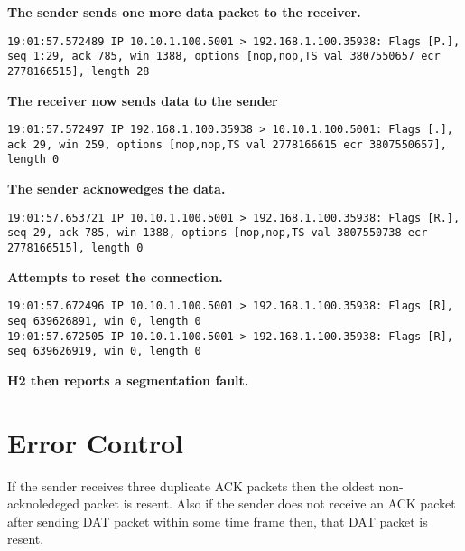 \documentclass{article}
\begin{document}
{\begin{lstlisting}
\end{lstlisting}
    \textbf{The sender sends one more data packet to the receiver.}
\begin{lstlisting}
19:01:57.572489 IP 10.10.1.100.5001 > 192.168.1.100.35938: Flags [P.], seq 1:29, ack 785, win 1388, options [nop,nop,TS val 3807550657 ecr 2778166515], length 28
\end{lstlisting}
    \textbf{The receiver now sends data to the sender}
\begin{lstlisting}
19:01:57.572497 IP 192.168.1.100.35938 > 10.10.1.100.5001: Flags [.], ack 29, win 259, options [nop,nop,TS val 2778166615 ecr 3807550657], length 0
\end{lstlisting}
    \textbf{The sender acknowedges the data.}
\begin{lstlisting}
19:01:57.653721 IP 10.10.1.100.5001 > 192.168.1.100.35938: Flags [R.], seq 29, ack 785, win 1388, options [nop,nop,TS val 3807550738 ecr 2778166515], length 0
\end{lstlisting}
    \textbf{Attempts to reset the connection.}
\begin{lstlisting}
19:01:57.672496 IP 10.10.1.100.5001 > 192.168.1.100.35938: Flags [R], seq 639626891, win 0, length 0
19:01:57.672505 IP 10.10.1.100.5001 > 192.168.1.100.35938: Flags [R], seq 639626919, win 0, length 0
\end{lstlisting}
    \textbf{H2 then reports a segmentation fault.}
}

\newpage
\section{Error Control}
If the sender receives three duplicate ACK packets then the oldest non-acknoledeged packet is resent.
Also if the sender does not receive an ACK packet after sending DAT packet within some time frame then,
that DAT packet is resent.
\end{document}
